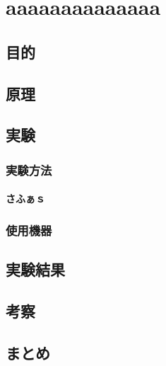 \documentclass[uplatex]{jsarticle}
\begin{document}
	\chapter*{aaaaaaaaaaaaaa}

	\section{目的}

	\section{原理}



	\section{実験}

		\subsection{実験方法}

			\subsubsection{さふぁｓ}


		\subsection{使用機器}



	\section{実験結果}



	\section{考察}



	\section{まとめ}

	\begin{thebibliography}{9}

	\end{thebibliography}
\end{document}
